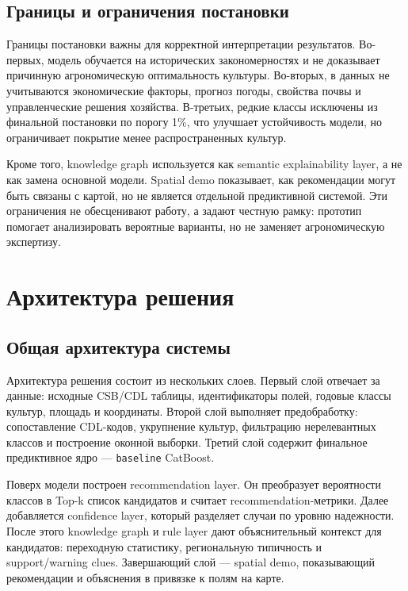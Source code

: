 \documentclass[a4paper,article,14pt]{extarticle}
\begin{document}
\subsection{Границы и ограничения постановки}

Границы постановки важны для корректной интерпретации результатов. Во-первых, модель обучается на исторических закономерностях и не доказывает причинную агрономическую оптимальность культуры. Во-вторых, в данных не учитываются экономические факторы, прогноз погоды, свойства почвы и управленческие решения хозяйства. В-третьих, редкие классы исключены из финальной постановки по порогу 1\%, что улучшает устойчивость модели, но ограничивает покрытие менее распространенных культур.

Кроме того, knowledge graph используется как semantic explainability layer, а не как замена основной модели. Spatial demo показывает, как рекомендации могут быть связаны с картой, но не является отдельной предиктивной системой. Эти ограничения не обесценивают работу, а задают честную рамку: прототип помогает анализировать вероятные варианты, но не заменяет агрономическую экспертизу.

\section{Архитектура решения}

\subsection{Общая архитектура системы}

Архитектура решения состоит из нескольких слоев. Первый слой отвечает за данные: исходные CSB/CDL таблицы, идентификаторы полей, годовые классы культур, площадь и координаты. Второй слой выполняет предобработку: сопоставление CDL-кодов, укрупнение культур, фильтрацию нерелевантных классов и построение оконной выборки. Третий слой содержит финальное предиктивное ядро --- \texttt{baseline} CatBoost.

Поверх модели построен recommendation layer. Он преобразует вероятности классов в Top-k список кандидатов и считает recommendation-метрики. Далее добавляется confidence layer, который разделяет случаи по уровню надежности. После этого knowledge graph и rule layer дают объяснительный контекст для кандидатов: переходную статистику, региональную типичность и support/warning clues. Завершающий слой --- spatial demo, показывающий рекомендации и объяснения в привязке к полям на карте.
\end{document}
